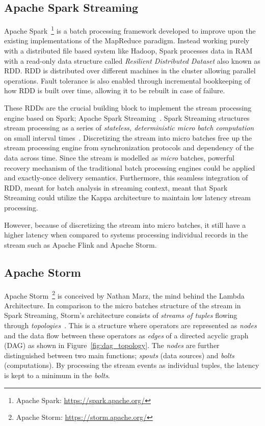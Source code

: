 \subsection{Apache Spark Streaming}%
\label{sub:Apache Spark}
Apache Spark~\footnote{Apache Spark: \url{https://spark.apache.org/}} is a batch 
processing framework developed to improve upon the existing implementations of the 
MapReduce paradigm. Instead working purely with a distributed file based system like 
Hadoop, Spark processes data in RAM with a read-only data structure called 
\emph{Resilient Distributed Dataset} also known as RDD. RDD is distributed over 
different machines in the cluster allowing parallel operations. Fault tolerance 
is also enabled through incremental bookkeeping of how RDD is built over time, allowing 
it to be rebuilt in case of failure.

These RDDs are the crucial building block to implement the stream processing engine 
based on Spark; Apache Spark Streaming~\cite{spark_streaming}. Spark Streaming structures
stream processing as a series of \emph{stateless, deterministic micro batch
computation} on small interval times~\cite{spark_streaming}. Discretizing the stream 
into micro batches free up the stream processing engine from synchronization protocols 
and dependency of the data across time. Since the stream is modelled as \emph{micro} 
batches, powerful recovery mechanism of the traditional batch processing engines could
be applied and exactly-once delivery semantics. 
Furthermore, this seamless integration of RDD, meant for batch analysis in 
streaming context, meant that Spark Streaming could utilize the Kappa architecture 
to maintain low latency stream processing. 

However, because of discretizing the stream into micro batches, it still have a 
higher latency when compared to systems processing individual records in the stream
such as Apache Flink and Apache Storm. 


\subsection{Apache Storm}%
\label{sub:Apache Storm}

Apache Storm~\footnote{Apache Storm: \url{https://storm.apache.org/}} is 
conceived by Nathan Marz, the mind behind the Lambda Architecture. In comparison to 
the micro batches structure of the stream in Spark Streaming, Storm's architecture 
consists of \emph{streams of tuples} flowing through
\emph{topologies}~\cite{storm_twitter}. This is a structure where operators are 
represented as \emph{nodes} and the data flow between these operators as \emph{edges} of 
a directed acyclic graph (DAG) as shown in Figure~\ref{fig:dag_topology}. 
The \emph{nodes} are further distinguished between 
two main functions; \emph{spouts} (data sources) and \emph{bolts} (computations).  
By processing the stream events as individual tuples, the latency is kept 
to a minimum in the \emph{bolts}. 

